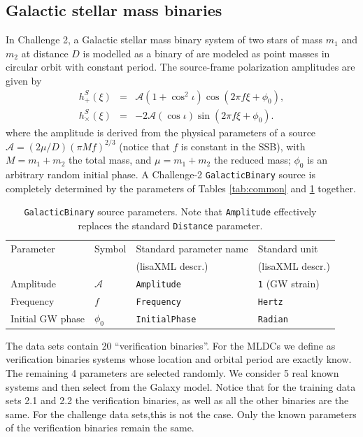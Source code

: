 \documentclass[12pt]{iopart}
\begin{document}
\subsection{Galactic stellar mass binaries}
\label{ss:WD}

In Challenge 2, a Galactic stellar mass binary system of two stars of mass $m_1$ and $m_2$ at distance $D$  is modelled as a binary of are modeled as point masses in circular orbit with constant period. The source-frame polarization amplitudes are given by
%
\begin{eqnarray}
h^S_+(\xi)  & = & \mathcal{A} \left(1 + \cos^2{\iota}\right) \cos(2\pi f \xi + \phi_0), \\
h^S_\times(\xi) & = & -2 \mathcal{A} (\cos{\iota}) \sin(2\pi f \xi + \phi_0). \nonumber
\end{eqnarray}
%
where the amplitude is derived from the physical parameters of a source $\mathcal{A} = (2 \mu / D) (\pi M f)^{2/3}$ (notice that $f$ is constant in the SSB), with $M = m_1 + m_2$ the total mass, and $\mu = m_1 + m_2$ the reduced mass; $ \phi_0$ is an arbitrary random initial phase. A Challenge-2 \texttt{GalacticBinary} source is completely determined by the parameters of Tables \ref{tab:common} and \ref{tab:galactic} together. %
\begin{table}
\begin{tabular}{llll}
\hline
{Parameter} &
{Symbol} &
{Standard parameter name} &
{Standard unit} \\
& & (lisaXML descr.) & (lisaXML descr.) \\
\hline
Amplitude           & $\mathcal{A}$ & \texttt{Amplitude}    & \texttt{1} (GW strain) \\
Frequency           & $f$           & \texttt{Frequency}    & \texttt{Hertz} \\
Initial GW phase    & $\phi_0$      & \texttt{InitialPhase} & \texttt{Radian} \\
\hline
\end{tabular}
\caption{\texttt{GalacticBinary} source parameters. Note that \texttt{Amplitude} effectively replaces the standard \texttt{Distance} parameter.\label{tab:galactic}}
\end{table}
The data sets contain 20 ``verification binaries''. For the MLDCs we define as verification binaries systems whose location and orbital period are exactly know. The remaining 4 parameters are selected randomly. We consider 5 real known systems and then select from the Galaxy model. Notice that for the training data sets 2.1 and 2.2 the verification binaries, as well as all the other binaries are the same. For the challenge data sets,this is not the case. Only the known parameters of the verification binaries remain the same. 
\end{document}
